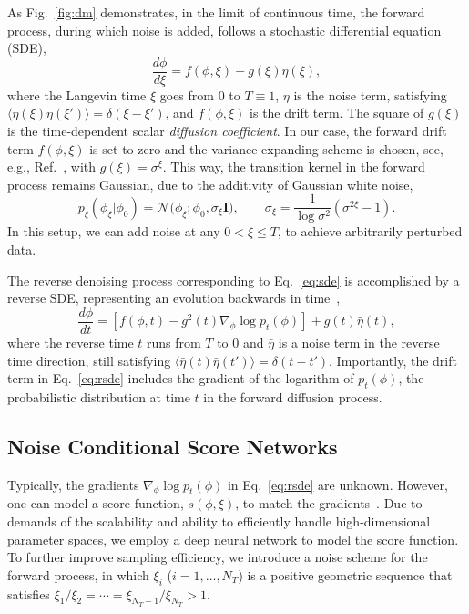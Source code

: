 \documentclass[a4paper,11pt]{article}
\begin{document}
As Fig.~\ref{fig:dm} demonstrates, in the limit of continuous time, the forward process, during which noise is added, follows a stochastic differential equation (SDE),
\begin{equation}
\frac{d \phi}{d\xi } = f(\phi, \xi) + g(\xi) \eta(\xi),
\label{eq:sde}
\end{equation}
where the Langevin time $\xi$ goes from $0$ to $T\equiv 1$, $\eta$ is the noise term, satisfying {$\langle \eta(\xi)\eta(\xi')\rangle= \delta(\xi-\xi')$}, and $f(\phi, \xi)$ is the drift term. The square of $g(\xi)$ is the time-dependent scalar \textit{diffusion coefficient}. In our case, the forward drift term $f(\phi,\xi)$ is set to zero and the variance-expanding scheme is chosen, see, e.g., Ref.~\cite{song2020score}, with $g(\xi) = \sigma^{\xi}$. This way, the transition kernel in the forward process  remains Gaussian, due to the additivity of Gaussian white noise,
\begin{equation}
    p_{\xi}(\phi_\xi | \phi_0) = \mathcal{N}\bigg(\phi_\xi; \phi_0, \sigma_\xi \mathbf{I}\bigg),
    \qquad
    \sigma_\xi = \frac{1}{\log \sigma^2}(\sigma^{2\xi} - 1).
    \label{eq:sbm}
\end{equation}
In this setup, we can add noise at any $0<\xi\leq T$, to achieve arbitrarily perturbed data.

The reverse denoising process corresponding to Eq.~\eqref{eq:sde} is accomplished by a reverse SDE, representing an evolution backwards in time~\cite{anderson:1982reversetime},
\begin{equation}
  \frac{d\phi}{dt} = \left[ f(\phi, t) - g^2(t)\nabla_{\phi}\log p_t(\phi) \right] 
  + g(t) \bar{\eta}(t),
  \label{eq:rsde}
\end{equation}
where the reverse time $t$ runs from $T$ to $0$ and $\bar{\eta}$ is a noise term in the reverse time direction, still satisfying $\langle \bar \eta(t) \bar \eta(t')\rangle = \delta(t-t')$. Importantly, the drift term in Eq.~\eqref{eq:rsde} includes the gradient of the logarithm of $p_t(\phi)$, the probabilistic distribution at time $t$ in the forward diffusion process.


\subsection{Noise Conditional Score Networks}
\label{sec:ncsn}

Typically, the gradients $\nabla_{\phi}\log p_t(\phi)$ in Eq.~\eqref{eq:rsde} are unknown. However, one can model a score function, $s(\phi, \xi)$, to match the gradients~\cite{song2020score}. Due to demands of the scalability and ability to efficiently handle high-dimensional parameter spaces, we employ a deep neural network to model the score function. To further improve sampling efficiency, we introduce a noise scheme for the forward process, in which $\xi_i$ ($i=1, \ldots, N_T$) is a positive geometric sequence that satisfies $\xi_1/\xi_2 = \cdots = \xi_{N_T-1}/\xi_{N_T} > 1$. 
\end{document}
